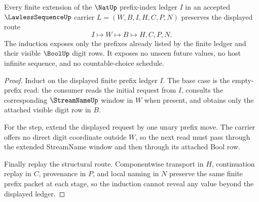 \begin{theorem}
\label{thm:lawlesssequence-finite-prefix-induction}
Every finite extension of the $\NatUp$ prefix-index ledger $I$ in an accepted $\LawlessSequenceUp$ carrier $L=(W,B,I,H,C,P,N)$ preserves the displayed route
$$
I\longmapsto W\longmapsto B\longmapsto H,C,P,N .
$$
The induction exposes only the prefixes already listed by the finite ledger and their visible $\BoolUp$ digit rows. It exposes no unseen future values, no host infinite sequence, and no countable-choice schedule.
\end{theorem}
\begin{proof}
Induct on the displayed finite prefix ledger $I$. The base case is the empty-prefix read: the consumer reads the initial request from $I$, consults the corresponding $\StreamNameUp$ window in $W$ when present, and obtains only the attached visible digit row in $B$.

For the step, extend the displayed request by one unary prefix move. The carrier offers no direct digit coordinate outside $W$, so the next read must pass through the extended StreamName window and then through its attached Bool row.

Finally replay the structural route. Componentwise transport in $H$, continuation replay in $C$, provenance in $P$, and local naming in $N$ preserve the same finite prefix packet at each stage, so the induction cannot reveal any value beyond the displayed ledger.
\end{proof}

